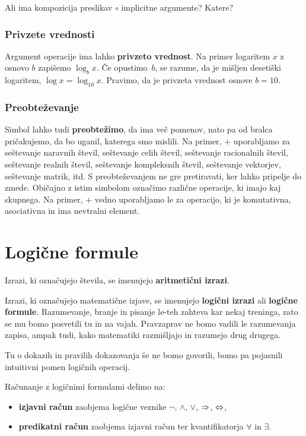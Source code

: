 \begin{naloga}
  Ali ima kompozicija preslikav $\circ$ implicitne argumente? Katere?
\end{naloga}

\subsubsection{Privzete vrednosti}
\label{sec:privzete-vrednosti}

Argument operacije ima lahko \textbf{privzeto vrednost}. Na primer logaritem $x$ z osnovo $b$ zapišemo $\log_b x$. Če opustimo~$b$, se razume, da je mišljen desetiški logaritem, $\log x = \log_{10} x$. Pravimo, da je privzeta vrednost osnove $b = 10$.

\subsubsection{Preobteževanje}
\label{sec:preobteevanje}

Simbol lahko tudi \textbf{preobtežimo}, da ima več pomenov, nato pa od bralca pričakujemo, da bo uganil, katerega smo
mislili. Na primer, $+$ uporabljamo za
%
seštevanje naravnih števil,
seštevanje celih števil,
seštevanje racionalnih števil,
seštevanje realnih števil,
seštevanje kompleksnih števil,
seštevanje vektorjev,
seštevanje matrik,
itd.
%
S preobteževanjem ne gre pretiravati, ker lahko pripelje do zmede. Običajno z istim simbolom označimo različne operacije, ki imajo kaj skupnega. Na primer, $+$ vedno uporabljamo le za operacijo, ki je komutativna, asociativna in ima nevtralni element.


\section{Logične formule}

Izrazi, ki označujejo števila, se imenujejo \textbf{aritmetični izrazi}.

Izrazi, ki označujejo matematične izjave, se imenujejo \textbf{logični izrazi} ali \textbf{logične formule}. Razumevanje, branje in pisanje le-teh zahteva kar nekaj treninga, zato se mu bomo posvetili tu in na vajah. Pravzaprav ne bomo vadili le razumevanja zapisa, ampak tudi, kako matematiki razmišljajo in razumejo drug drugega.

Tu o dokazih in pravilih dokazovanja še ne bomo govorili, bomo pa pojasnili intuitivni pomen logičnih operacij.

Računanje z logičnimi formulami delimo na:
%
\begin{itemize}
\item \textbf{izjavni račun} zaobjema logične veznike $\neg $, $\land$, $\lor$, $\Rightarrow$, $\Leftrightarrow$,
\item \textbf{predikatni račun} zaobjema izjavni račun ter kvantifikatorja $\forall$ in $\exists$.
\end{itemize}


